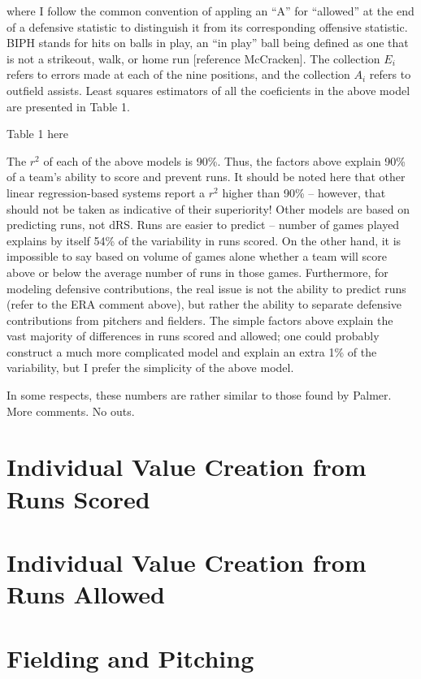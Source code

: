 \documentclass[a4paper,twoside,12pt]{article}
\begin{document}
where I follow the common convention of appling an ``A'' for ``allowed'' at the end of a defensive statistic to distinguish it from its corresponding offensive statistic.  BIPH stands for hits on balls in play, an ``in play'' ball being defined as one that is not a strikeout, walk, or home run [reference McCracken].  The collection ${E_i}$ refers to errors made at each of the nine positions, and the collection ${A_i}$ refers to outfield assists.  Least squares estimators of all the coeficients in the above model are presented in Table 1.

Table 1 here

The $r^2$ of each of the above models is 90\%.  Thus, the factors above explain 90\% of a team's ability to score and prevent runs.  It should be noted here that other linear regression-based systems report a $r^2$ higher than 90\% -- however, that should not be taken as indicative of their superiority!  Other models are based on predicting runs, not dRS.  Runs are easier to predict -- number of games played explains by itself 54\% of the variability in runs scored.  On the other hand, it is impossible to say based on volume of games alone whether a team will score above or below the average number of runs in those games.  Furthermore, for modeling defensive contributions, the real issue is not the ability to predict runs (refer to the ERA comment above), but rather the ability to separate defensive contributions from pitchers and fielders.  The simple factors above explain the vast majority of differences in runs scored and allowed; one could probably construct a much more complicated model and explain an extra 1\% of the variability, but I prefer the simplicity of the above model.

In some respects, these numbers are rather similar to those found by Palmer.  More comments.  No outs.

\section{Individual Value Creation from Runs Scored}



\section{Individual Value Creation from Runs Allowed}


\section{Fielding and Pitching}
\end{document}
